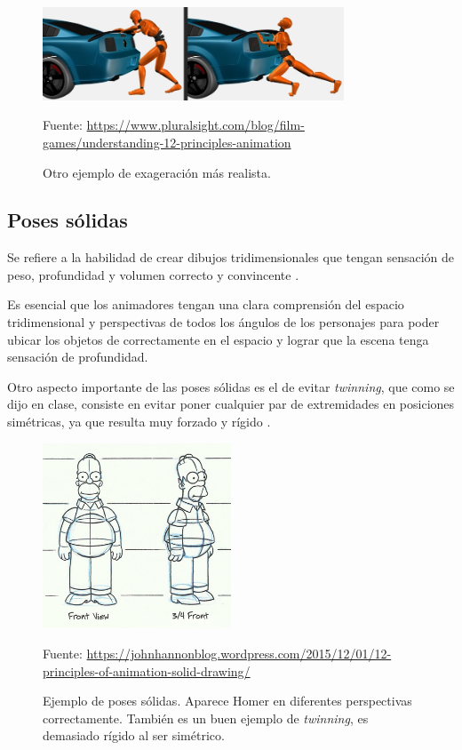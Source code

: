 \documentclass{article}
\begin{document}
\begin{figure}[H]
    \centering
    \includegraphics[width=0.8\textwidth]{imagenes/Exaggeration.png}
    \caption{Otro ejemplo de exageración más realista.}
    \vspace{10pt}
    \footnotesize{Fuente: \url{https://www.pluralsight.com/blog/film-games/understanding-12-principles-animation}}
\end{figure}

\subsection{Poses sólidas}

Se refiere a la habilidad de crear dibujos tridimensionales que tengan sensación de peso, profundidad y volumen correcto y convincente \cite{plural}.

\bigskip

Es esencial que los animadores tengan una clara comprensión del espacio tridimensional y perspectivas de todos los ángulos de los personajes para poder ubicar los objetos de correctamente en el espacio y lograr que la escena tenga sensación de profundidad.

\bigskip

Otro aspecto importante de las poses sólidas es el de evitar \textit{twinning}, que como se dijo en clase, consiste en evitar poner cualquier par de extremidades en posiciones simétricas, ya que resulta muy forzado y rígido \cite{plural}.

\begin{figure}[H]
    \centering
    \includegraphics[width=0.5\textwidth]{imagenes/homer-solid-drawing.jpg}
    \caption{Ejemplo de poses sólidas. Aparece Homer en diferentes perspectivas correctamente. También es un buen ejemplo de \textit{twinning}, es demasiado rígido al ser simétrico.}
    \vspace{10pt}
    \footnotesize{Fuente: \url{https://johnhannonblog.wordpress.com/2015/12/01/12-principles-of-animation-solid-drawing/}}
\end{figure}
\end{document}
